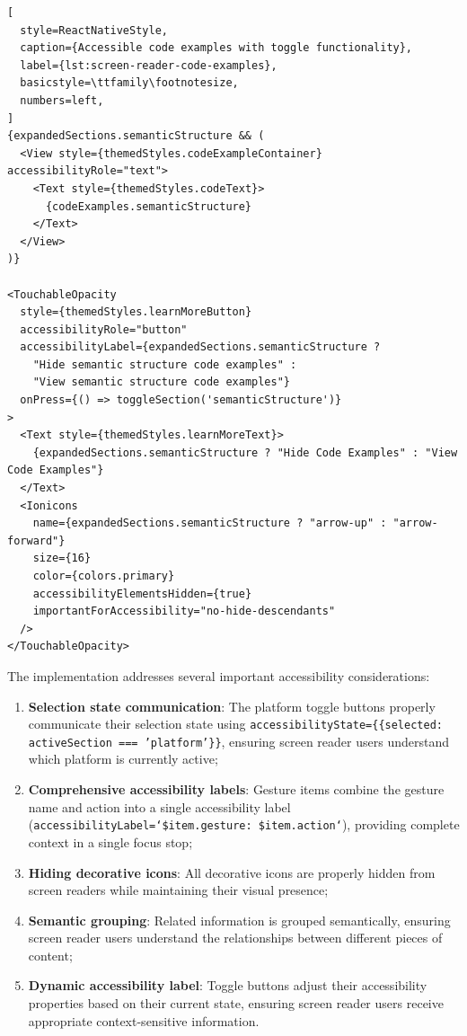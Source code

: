 \begin{lstlisting}[
  style=ReactNativeStyle,
  caption={Accessible code examples with toggle functionality},
  label={lst:screen-reader-code-examples},
  basicstyle=\ttfamily\footnotesize,
  numbers=left,
]
{expandedSections.semanticStructure && (
  <View style={themedStyles.codeExampleContainer} accessibilityRole="text">
    <Text style={themedStyles.codeText}>
      {codeExamples.semanticStructure}
    </Text>
  </View>
)}

<TouchableOpacity
  style={themedStyles.learnMoreButton}
  accessibilityRole="button"
  accessibilityLabel={expandedSections.semanticStructure ? 
    "Hide semantic structure code examples" : 
    "View semantic structure code examples"}
  onPress={() => toggleSection('semanticStructure')}
>
  <Text style={themedStyles.learnMoreText}>
    {expandedSections.semanticStructure ? "Hide Code Examples" : "View Code Examples"}
  </Text>
  <Ionicons
    name={expandedSections.semanticStructure ? "arrow-up" : "arrow-forward"}
    size={16}
    color={colors.primary}
    accessibilityElementsHidden={true}
    importantForAccessibility="no-hide-descendants"
  />
</TouchableOpacity>
\end{lstlisting}
\FloatBarrier

The implementation addresses several important accessibility considerations:

\begin{enumerate}
    \item \textbf{Selection state communication}: The platform toggle buttons properly communicate their selection state using \texttt{accessibilityState=\{\{selected: activeSection === 'platform'\}\}}, ensuring screen reader users understand which platform is currently active;
    
    \item \textbf{Comprehensive accessibility labels}: Gesture items combine the gesture name and action into a single accessibility label (\texttt{accessibilityLabel=`\${item.gesture}: \${item.action}`}), providing complete context in a single focus stop;
    
    \item \textbf{Hiding decorative icons}: All decorative icons are properly hidden from screen readers while maintaining their visual presence;
    
    \item \textbf{Semantic grouping}: Related information is grouped semantically, ensuring screen reader users understand the relationships between different pieces of content;
    
    \item \textbf{Dynamic accessibility label}: Toggle buttons adjust their accessibility properties based on their current state, ensuring screen reader users receive appropriate context-sensitive information.
\end{enumerate}

